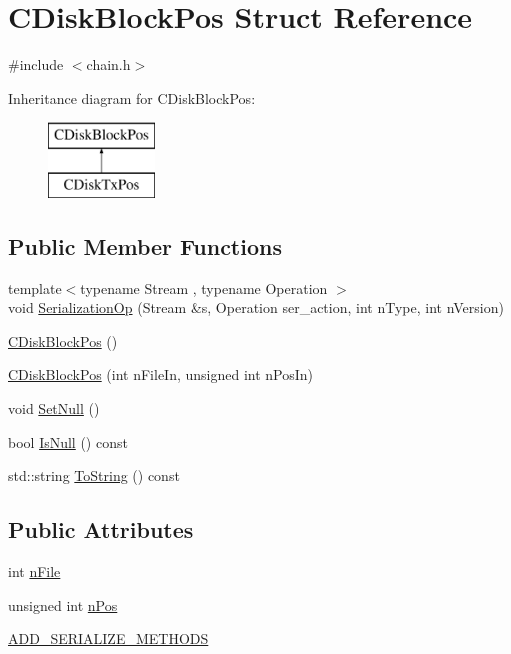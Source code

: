 \hypertarget{struct_c_disk_block_pos}{}\section{C\+Disk\+Block\+Pos Struct Reference}
\label{struct_c_disk_block_pos}


{\ttfamily \#include $<$chain.\+h$>$}

Inheritance diagram for C\+Disk\+Block\+Pos\+:\begin{figure}[H]
\begin{center}
\leavevmode
\includegraphics[height=2.000000cm]{struct_c_disk_block_pos}
\end{center}
\end{figure}
\subsection*{Public Member Functions}
\begin{DoxyCompactItemize}
\item 
{\footnotesize template$<$typename Stream , typename Operation $>$ }\\void \hyperlink{struct_c_disk_block_pos_a821bb4eebc99ae39c20133d80244325f}{Serialization\+Op} (Stream \&s, Operation ser\+\_\+action, int n\+Type, int n\+Version)
\item 
\hyperlink{struct_c_disk_block_pos_ac34e46c8bf3256b3eca09f54911cf8bd}{C\+Disk\+Block\+Pos} ()
\item 
\hyperlink{struct_c_disk_block_pos_a0c96947d09bb4aaf28ab2d7866d20918}{C\+Disk\+Block\+Pos} (int n\+File\+In, unsigned int n\+Pos\+In)
\item 
void \hyperlink{struct_c_disk_block_pos_a0a6ba113219a456472081ee6d6b20a72}{Set\+Null} ()
\item 
bool \hyperlink{struct_c_disk_block_pos_a924f2805b274345afce890b27a0934d9}{Is\+Null} () const 
\item 
std\+::string \hyperlink{struct_c_disk_block_pos_ab187c46272360bde44f6ae611373a984}{To\+String} () const 
\end{DoxyCompactItemize}
\subsection*{Public Attributes}
\begin{DoxyCompactItemize}
\item 
int \hyperlink{struct_c_disk_block_pos_a09f30dab5c02fbdea8a17f9bcee5aac8}{n\+File}
\item 
unsigned int \hyperlink{struct_c_disk_block_pos_a9b4b5e149b655ac5c22d05883b5bca0e}{n\+Pos}
\item 
\hyperlink{struct_c_disk_block_pos_a958cd730b290bbb0153d514c56517590}{A\+D\+D\+\_\+\+S\+E\+R\+I\+A\+L\+I\+Z\+E\+\_\+\+M\+E\+T\+H\+O\+D\+S}
\end{DoxyCompactItemize}
